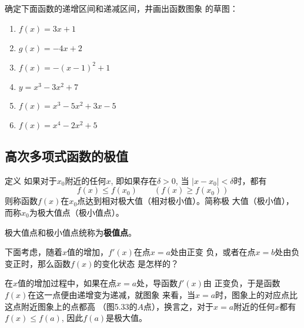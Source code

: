 \begin{ex}
    确定下面函数的递增区间和递减区间，井画出函数图象
    的草图：
\begin{multicols}{2}
\begin{enumerate}
    \item $f(x)=3x+1$
    \item $g(x)=-4x+2$
    \item $f(x)=-(x-1)^2+1$
    \item $y=x^3-3x^2+7$
    \item $f(x)=x^3-5x^2+3x-5$
    \item $f(x)=x^4-2x^2+5$
\end{enumerate}
\end{multicols}
\end{ex}

\subsection{高次多项式函数的极值}

\begin{blk}{定义}
   如果对于$x_0$附近的任何$x$, 即如果存在$\delta>0$, 当
$|x-x_0|<\delta$时，都有
\[f(x)\le f(x_0)\qquad (f(x)\ge f(x_0))\]
则称函数$f(x)$在$x_0$点达到相对极大值（相对极小值）。简称极
大值（极小值），而称$x_0$为极大值点（极小值点）。

极大值点和极小值点统称为\textbf{极值点}。
\end{blk}

下面考虑，随着$x$值的增加，$f'(x)$在点$x=a$处由正变
负，或者在点$x=b$处由负变正时，那么函数$f(x)$的变化状态
是怎样的？

在$x$值的增加过程中，如果在点$x=a$处，导函数$f'(x)$由
正变负，于是函数$f(x)$在这一点便由递增变为递减，就图象
来看，当$x=a$时，图象上的对应点比这点附近图象上的点都高
（图5.33的$A$点），换言之，对于$x=a$附近的任何$x$都有$f(x)\le 
f(a)$, 因此$f(a)$是极大值。
\begin{figure}[htp]
    \centering

    \caption{}
\end{figure}

